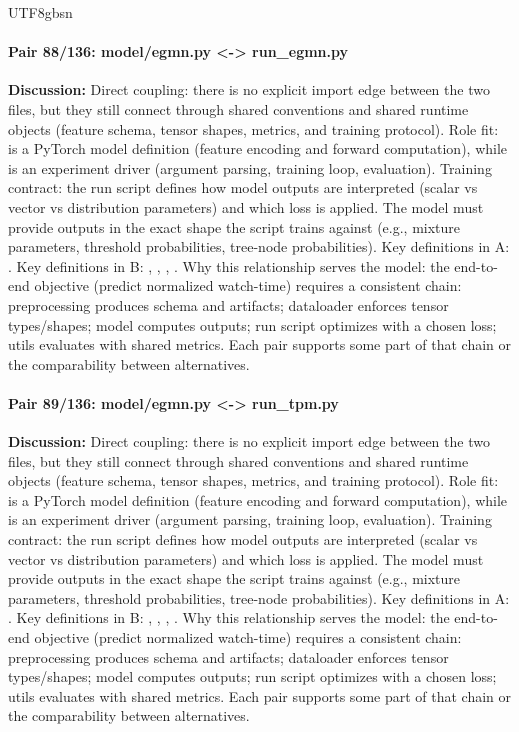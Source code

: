 \documentclass[11pt]{article}
\begin{document}
\begin{CJK*}{UTF8}{gbsn}
\paragraph{Pair 88/136: model/egmn.py <-> run\_egmn.py}
\textbf{Discussion:} Direct coupling: there is no explicit import edge between the two files, but they still connect through shared conventions and shared runtime objects (feature schema, tensor shapes, metrics, and training protocol). Role fit: \texttt{} is a PyTorch model definition (feature encoding and forward computation), while \texttt{} is an experiment driver (argument parsing, training loop, evaluation). Training contract: the run script defines how model outputs are interpreted (scalar vs vector vs distribution parameters) and which loss is applied. The model must provide outputs in the exact shape the script trains against (e.g., mixture parameters, threshold probabilities, tree-node probabilities). Key definitions in A: \texttt{}. Key definitions in B: \texttt{}, \texttt{}, \texttt{}, \texttt{}. Why this relationship serves the model: the end-to-end objective (predict normalized watch-time) requires a consistent chain: preprocessing produces schema and artifacts; dataloader enforces tensor types/shapes; model computes outputs; run script optimizes with a chosen loss; utils evaluates with shared metrics. Each pair supports some part of that chain or the comparability between alternatives.

\paragraph{Pair 89/136: model/egmn.py <-> run\_tpm.py}
\textbf{Discussion:} Direct coupling: there is no explicit import edge between the two files, but they still connect through shared conventions and shared runtime objects (feature schema, tensor shapes, metrics, and training protocol). Role fit: \texttt{} is a PyTorch model definition (feature encoding and forward computation), while \texttt{} is an experiment driver (argument parsing, training loop, evaluation). Training contract: the run script defines how model outputs are interpreted (scalar vs vector vs distribution parameters) and which loss is applied. The model must provide outputs in the exact shape the script trains against (e.g., mixture parameters, threshold probabilities, tree-node probabilities). Key definitions in A: \texttt{}. Key definitions in B: \texttt{}, \texttt{}, \texttt{}, \texttt{}. Why this relationship serves the model: the end-to-end objective (predict normalized watch-time) requires a consistent chain: preprocessing produces schema and artifacts; dataloader enforces tensor types/shapes; model computes outputs; run script optimizes with a chosen loss; utils evaluates with shared metrics. Each pair supports some part of that chain or the comparability between alternatives.


\end{CJK*}
\end{document}
